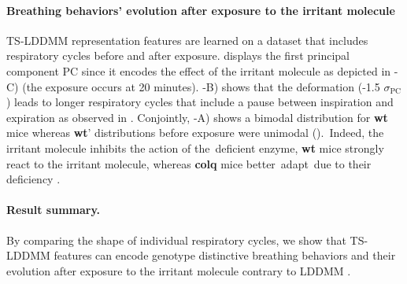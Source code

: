 \paragraph{Breathing behaviors' evolution after exposure to the irritant molecule} 
TS-LDDMM representation features are learned on a dataset that includes respiratory cycles before and after exposure.
  displays the first principal component PC since it encodes the effect of the irritant molecule as depicted in -C) (the exposure occurs at 20 minutes). -B) shows that the deformation (-1.5 $\sigma_{\text{PC}}$) leads to longer respiratory cycles that include a pause between inspiration and expiration as observed in \cite{germain2023unsupervised}.
  Conjointly, -A) shows a bimodal distribution for \textbf{wt} mice whereas \textbf{wt}' distributions before exposure were unimodal (). Indeed, the irritant molecule inhibits the action of the deficient enzyme, \textbf{wt} mice strongly react to the irritant molecule, whereas \textbf{colq} mice better adapt due to their deficiency \cite{germain2023unsupervised}.
  \vspace{-1ex}
\paragraph{Result summary.} By comparing the shape of individual respiratory cycles, we show that TS-LDDMM features can encode genotype distinctive breathing behaviors and their evolution after exposure to the irritant molecule contrary to LDDMM \cite{glaunes2008large}. 
\vspace{-1ex}
%
